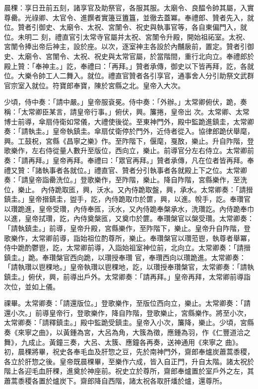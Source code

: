 \begin{pinyinscope}
 晨稞：享日丑前五刻，諸享官及助祭官，各服其服。太廟令、良醖令帥其屬，入實尊罍。光祿卿、太官令、進饌者實籩豆簠簋，並徹去蓋冪。奉禮郎、贊者先入，就位。贊者引御史、太廟令、太祝、宮闈令、祝史與執事官等，各自東偏門入，就位。未明二
 刻，禮直官引太常寺官屬并太祝、宮闈令升殿，開始祖祏室。太祝、宮闈令捧出帝后神主，設於座。以次，逐室神主各設於內黼扆前，置定。贊者引御史、太廟令、宮闈令、太祝、祝史與太常官屬，於當階間，重行北向立。奉禮郎於殿上贊：「奉神主。」訖，奉禮曰：「再拜。」贊者承傳，御史以下皆再拜，訖，各就位。大樂令帥工人二舞入。就位。禮直官贊者各引享官，通事舍人分引助祭文武群官宗室入就位。符寶郎奉寶，陳於宮縣之北。皇帝入大次。



 少頃，侍中奏：「請中嚴。」皇帝服袞冕。侍中奏：「外辦。」太常卿俯伏，跪，奏稱：「太常卿臣某言，請皇帝行事。」俯伏，興。簾捲，皇帝出
 次。太常卿、太常博士前導，傘扇侍衛如常儀，大禮使後從。至東神門外，殿中監跪進鎮圭，太常卿奏：「請執圭。」皇帝執鎮圭。傘扇仗衛停於門外，近侍者從入。協律郎跪伏舉麾，興。工鼓柷，宮縣《昌寧之樂》作。至阼階下，偃麾，戛敔，樂止。升自阼階，登歌樂作，左右侍從量人數升至版位，西向立，樂止。前導官分左右侍立。太常卿前奏：「請再拜。」皇帝再拜。奉禮曰：「眾官再拜。」贊者承傳，凡在位者皆再拜。奉禮又贊：「諸執事者各就位。」禮直官、贊者分引執事者各就殿上下之位。太常卿奏：「請皇帝詣罍洗位。」登歌樂作，至阼階，樂止。降自阼階，宮縣樂作，至洗位，樂止。
 內侍跪取匜，興，沃水。又內侍跪取盤，興，承水。太常卿奏：「請搢鎮圭。」皇帝搢鎮圭，盥手，訖，內侍跪取巾於篚，興，以進。帨手，訖。奉瓚官以瓚跪進，皇帝受瓚，內侍奉匜，沃水，又內侍跪奉槃承水，洗瓚訖。內侍跪奉巾以進，皇帝拭瓚，訖，內侍奠槃匜，又奠巾於篚。奉瓚槃官以槃受瓚。太常卿奏：「請執鎮圭。」前導，皇帝升殿，宮縣樂作，至阼階下，樂止。皇帝升自阼階，登歌樂作，太常卿前導，詣始祖位酌尊所，樂止。奉瓚槃官以瓚蒞鬯，執尊者舉冪，侍中跪酌鬱鬯，訖，太常卿前導，入詣始祖室神位前，北向立。太常卿奏：「請搢鎮圭。」跪。奉瓚槃官西向跪，以瓚授奉瓚
 官，奉瓚西向以瓚跪進。太常卿奏：「請執瓚以鬯稞地。」皇帝執瓚以鬯稞地，訖，以瓚授奉瓚槃官，太常卿奏：「請執鎮圭。」俯伏，興，前導出戶外。太常卿奏：「請再拜。」皇帝再拜，太常卿前導詣次位，並如上儀。



 祼畢。太常卿奏：「請還版位。」登歌樂作，至版位西向立，樂止。太常卿奏：「請還小次。」前導皇帝行，登歌樂作，降自阼階，登歌樂止，宮縣樂作。將至小次，太常卿奏：「請釋鎮圭。」殿中監跪受鎮圭。皇帝入小次，簾降，樂止。少頃，宮縣奏《來寧之曲》，以黃鍾為宮，大呂為角，大簇為徵，應鍾為羽，作《仁豐道洽之舞》，九成止。黃鐘三奏，大呂、太簇、應鐘各再奏，送神通用《來寧之
 曲》。初，晨稞將畢，祝史各奉毛血及肝惣之豆，先於南神門外，齋郎奉爐炭蕭蒿黍稷，各立於肝惣之後。皇帝既晨稞畢，至樂作六成，皆入自正門，升自太階。諸太祝於階上各迎毛血肝稞，進奠於神座前。祝史立於尊所，齋郎奉爐置於室戶外之左，其蕭蒿黍稷各置於爐炭下。齋郎降自西階，諸太祝各取肝燔於爐，還尊所。




\end{pinyinscope}
